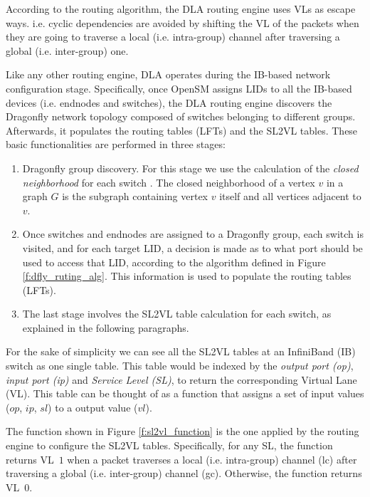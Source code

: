 \documentclass[review]{elsarticle}
\newcommand{\dfly}{Dragonfly}
\newcommand{\ib}{IB}
\newcommand{\ibl}{InfiniBand}
\begin{document}
According to the routing algorithm, the DLA routing engine uses VLs as escape ways.
i.e. cyclic dependencies are avoided by shifting the VL of the packets when they are going to traverse a local (i.e. intra-group)
channel after traversing a global (i.e. inter-group) one.

Like any other routing engine, DLA operates during the \ib-based network configuration stage.
Specifically, once OpenSM assigns LIDs to all the \ib-based devices (i.e. endnodes and switches),
the DLA routing engine discovers the \dfly{} network topology composed of switches belonging to different groups.
Afterwards, it populates the routing tables (LFTs) and the SL2VL tables.
These basic functionalities are performed in three stages:

\begin{enumerate}
\item \dfly{} group discovery. For this stage we use the calculation of the \emph{closed neighborhood} for each switch \cite{maglione2018_d3r}.
The closed neighborhood of a vertex $v$ in a graph $G$ is the subgraph containing vertex $v$ itself and all vertices adjacent to $v$.

\item Once switches and endnodes are assigned to a \dfly{} group, each switch is visited, and for each target LID,
      a decision is made as to what port should be used to access that LID, according to the algorithm defined in Figure \ref{f:dfly_ruting_alg}.
      This information is used to populate the routing tables (LFTs).
      
\item The last stage involves the SL2VL table calculation for each switch, as explained in the following paragraphs.
\end{enumerate}

For the sake of simplicity we can see all the SL2VL tables at an \ibl{} (\ib{}) switch as one single table.
This table would be indexed by the \emph{output port (op)}, \emph{input port (ip)} and \emph{Service Level (SL)},
to return the corresponding Virtual Lane (VL).
This table can be thought of as a function that assigns a set of input values ($op$, $ip$, $sl$) to a output value ($vl$).

The function shown in Figure \ref{f:sl2vl_function}
is the one applied by the routing engine to configure the SL2VL tables.
Specifically, for any SL, the function returns VL~$1$ when a packet traverses a local (i.e. intra-group) channel (lc)
after traversing a global (i.e. inter-group) channel (gc).
Otherwise, the function returns VL~$0$.
\end{document}
